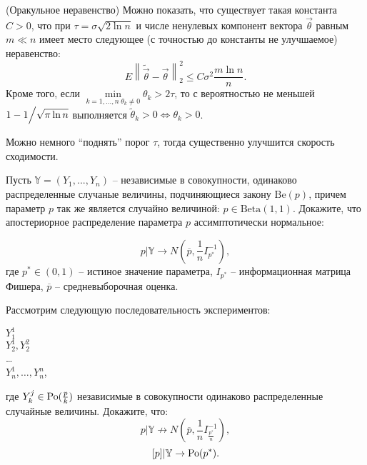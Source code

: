 \begin{remark} (Оракульное неравенство) Можно показать, что 
существует такая константа $C>0$, что при $\tau =\sigma \sqrt {2\ln n} $ и 
числе ненулевых компонент вектора $\vec {\theta }$ равным $m\ll n$ имеет 
место следующее (с точностью до константы не улучшаемое) неравенство:
\[
E\left\| {\tilde {\vec {\theta }}-\vec {\theta }} \right\|_2^2 \le C\sigma 
^2\frac{m\ln n}{n}.
\]
Кроме того, если $ \underset{ k=1,...,n \; \theta _k \ne 0}{\min}  \theta _k >2\tau $, то
с вероятностью не меньшей $ 1-1 \mathord{\left/ {\vphantom {1 {\sqrt {\pi \ln n} }}} \right. \kern-\nulldelimiterspace} {\sqrt {\pi \ln n} }$ выполняется $\tilde {\theta }_k >0\Leftrightarrow \theta _k >0$.

 
Можно немного ``поднять'' порог $\tau $, тогда существенно улучшится 
скорость сходимости.
\end{remark}


\begin{problem}
Пусть $\mathbb{Y} = (Y_1, ..., Y_n)$ -- независимые в совокупности, одинаково распределенные случаные величины, подчиняющиеся закону $\mathrm{Be}(p)$, причем параметр $p$ так же является случайно величиной: $p \in \mathrm{Beta}(1,1)$. Докажите, что апостериорное распределение параметра $p$ ассимптотически нормальное:

$$
p|\mathbb{Y} \rightarrow N \left(\overline{p}, \frac{1}{n}I_{p^*}^{-1} \right),
$$ 
где $p^* \in (0, 1)$ -- истиное значение параметра, $I_{p^*}$ -- информационная матрица Фишера, $\overline{p}$ -- средневыборочная оценка.

Рассмотрим следующую последовательность экспериментов: 
\begin{center}
$Y_1^1$ \\
$Y_2^1, Y_2^2$ \\ 
\ldots \\
$Y_n^1,\ldots, Y_n^n$,
\end{center}
где  $Y_k^j \in \mathrm{Po}(\frac{p}{k})$ независимые в совокупности одинаково распределенные случайные величины. Докажите, что:
\[
p|\mathbb{Y} \not\rightarrow N \left(\overline{p},\frac{1}{n}I_{\frac{p^*}{n}}^{-1} \right),
\]
\[
[p]|\mathbb{Y} \rightarrow \mathrm{Po}(p^*).
\]


\end{problem}



